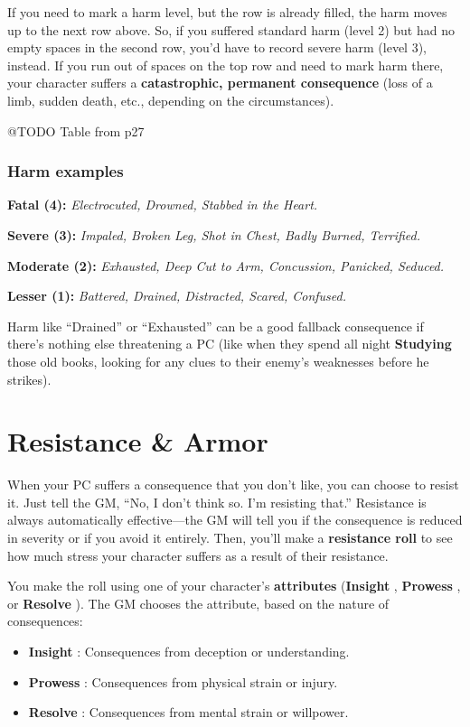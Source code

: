 \documentclass[11pt,fleqn,a5paper]{book}
\newcommand{\gameterm}[1]{\textbf{#1}}
\begin{document}
If you need to mark a harm level, but the row is already filled, the harm moves up to the next row above. So, if you suffered standard harm (level 2) but had no empty spaces in the second row, you’d have to record severe harm (level 3), instead. If you run out of spaces on the top row and need to mark harm there, your character suffers a \textbf{catastrophic, permanent consequence} (loss of a limb, sudden death, etc., depending on the circumstances).

@TODO Table from p27


\subsection{Harm examples}

\textbf{Fatal (4):} \emph{Electrocuted, Drowned, Stabbed in the Heart.}

\textbf{Severe (3):} \emph{Impaled, Broken Leg, Shot in Chest, Badly Burned, Terrified.}

\textbf{Moderate (2):} \emph{Exhausted, Deep Cut to Arm, Concussion, Panicked, Seduced.}

\textbf{Lesser (1):} \emph{Battered, Drained, Distracted, Scared, Confused.}

Harm like “Drained” or “Exhausted” can be a good fallback consequence if there’s nothing else threatening a PC (like when they spend all night \gameterm{Studying}  those old books, looking for any clues to their enemy’s weaknesses before he strikes).

\chapter{Resistance \& Armor}

When your PC suffers a consequence that you don’t like, you can choose to resist it. Just tell the GM, “No, I don’t think so. I’m resisting that.” Resistance is always automatically effective---the GM will tell you if the consequence is reduced in severity or if you avoid it entirely. Then, you’ll make a \textbf{resistance roll} to see how much stress your character suffers as a result of their resistance.

You make the roll using one of your character’s \textbf{attributes} (\gameterm{Insight} , \gameterm{Prowess} , or \gameterm{Resolve} ). The GM chooses the attribute, based on the nature of consequences:

\begin{itemize}
	\item \gameterm{Insight} : Consequences from deception or understanding.
	\item \gameterm{Prowess} : Consequences from physical strain or injury.
	\item \gameterm{Resolve} : Consequences from mental strain or willpower.
\end{itemize}
\end{document}
